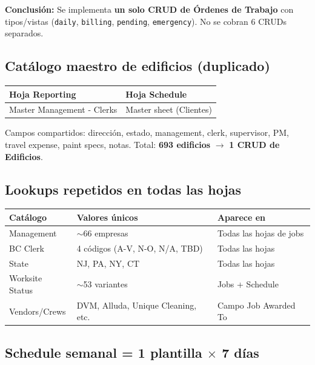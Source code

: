 \documentclass[11pt,a4paper]{article}
\begin{document}
\textbf{Conclusi\'on:} Se implementa \textbf{un solo CRUD de \'Ordenes de Trabajo} con tipos/vistas (\texttt{daily}, \texttt{billing}, \texttt{pending}, \texttt{emergency}). No se cobran 6 CRUDs separados.

\subsection{Cat\'alogo maestro de edificios (duplicado)}

\begin{table}[h]
\centering
\begin{tabular}{@{}ll@{}}
\toprule
\textbf{Hoja Reporting} & \textbf{Hoja Schedule} \\
\midrule
Master Management - Clerks & Master sheet (Clientes) \\
\bottomrule
\end{tabular}
\end{table}

Campos compartidos: direcci\'on, estado, management, clerk, supervisor, PM, travel expense, paint specs, notas. Total: \textbf{693 edificios} $\rightarrow$ \textbf{1 CRUD de Edificios}.

\subsection{Lookups repetidos en todas las hojas}

\begin{table}[h]
\centering
\small
\begin{tabular}{@{}lll@{}}
\toprule
\textbf{Cat\'alogo} & \textbf{Valores \'unicos} & \textbf{Aparece en} \\
\midrule
Management & $\sim$66 empresas & Todas las hojas de jobs \\
BC Clerk & 4 c\'odigos (A-V, N-O, N/A, TBD) & Todas las hojas \\
State & NJ, PA, NY, CT & Todas las hojas \\
Worksite Status & $\sim$53 variantes & Jobs + Schedule \\
Vendors/Crews & DVM, Alluda, Unique Cleaning, etc. & Campo Job Awarded To \\
\bottomrule
\end{tabular}
\end{table}

\subsection{Schedule semanal = 1 plantilla $\times$ 7 d\'ias}
\end{document}
